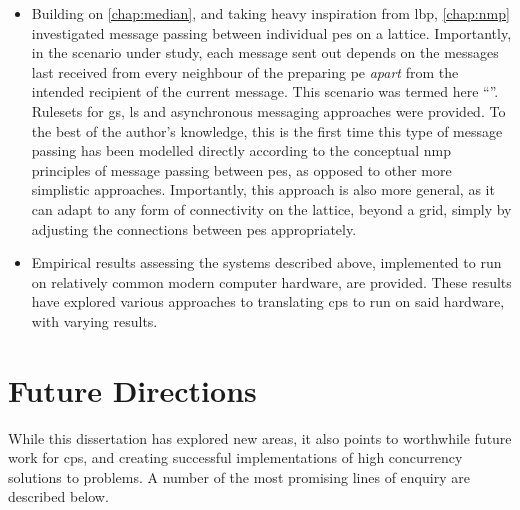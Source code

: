 \begin{itemize}
    \item Building on \cref{chap:median}, and taking heavy inspiration from \gls{lbp}, \cref{chap:nmp} investigated message passing between individual \glspl{pe} on a lattice. Importantly, in the scenario under study, each message sent out depends on the messages last received from every neighbour of the preparing \gls{pe} \emph{apart} from the intended recipient of the current message.  This scenario was termed here ``''.  Rulesets for \gls{gs}, \gls{ls} and asynchronous messaging approaches were provided.  To the best of the author's knowledge, this is the first time this type of message passing has been modelled directly according to the conceptual \gls{nmp} principles of message passing between \glspl{pe}, as opposed to other more simplistic approaches.  Importantly, this approach is also more general, as it can adapt to any form of connectivity on the lattice, beyond a grid, simply by adjusting the connections between \glspl{pe} appropriately.
    \item Empirical results assessing the systems described above, implemented to run on relatively common modern computer hardware, are provided.  These results have explored various approaches to translating \gls{cps} to run on said hardware, with varying results.
\end{itemize}

\section{Future Directions}

While this dissertation has explored new areas, it also points to worthwhile future work for \gls{cps}, and creating successful implementations of high concurrency solutions to problems.  A number of the most promising lines of enquiry are described below.


